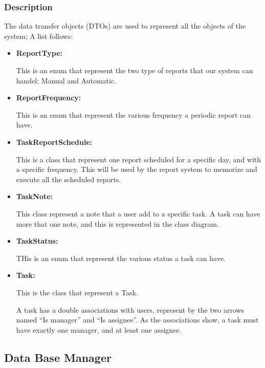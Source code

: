 \documentclass{article}
\begin{document}
\subsubsection{Description}

The data transfer objects (DTOs) are used to represent
all the objects of the system; A list follows:

\begin{itemize}
    \item \textbf{ReportType: }

    This is an enum that represent the two type of reports that our system can handel: Manual and Automatic.

    \item \textbf{ReportFrequency: }

    This is an enum that represent the various frequency a periodic report can have.

    \item \textbf{TaskReportSchedule: }

    This is a class that represent one report scheduled for a specific day, and with a specific frequency.
    This will be used by the report system to memorize and execute all the scheduled reports.

    \item \textbf{TaskNote: }
    
    This class represent a note that a user add to a specific task.
    A task can have more that one note, and this is represented in the class diagram.

    \item \textbf{TaskStatus: }
    
    THis is an enum that represent the various status a task can have.

    \item \textbf{Task: }
    
    This is the class that represent a Task.

    A task has a double associations with users, represent by the two arrows named ``Is manager'' and ``Is assignee''.
    As the associations show, a task must have exactly one manager, and at least one assignee.


\end{itemize}

\subsection{Data Base Manager}
\end{document}
